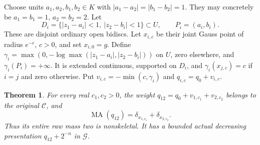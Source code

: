 \documentclass[11pt]{article}
\newtheorem{theorem}{Theorem}
\newcommand{\MA}{\operatorname{MA}}
\newcommand{\C}{\mathcal C}
\newcommand{\G}{\mathcal G}
\begin{document}
Choose units $a_1,a_2,b_1,b_2\in K$ with
$|a_1-a_2|=|b_1-b_2|=1$. They may concretely be $a_1=b_1=1$,
$a_2=b_2=2$. Let
\[
 D_i=\{|z_1-a_i|<1,\ |z_2-b_i|<1\}\subset U,
 \qquad P_i=(a_i,b_i).
\]
These are disjoint ordinary open bidiscs. Let $x_{i,c}$ be their joint
Gauss point of radius $e^{-c}$, $c>0$, and set $x_{i,0}=g$.
Define $\gamma_i=\max(0,-\log\max(|z_1-a_i|,|z_2-b_i|))$ on $U$,
zero elsewhere, and $\gamma_i(P_i)=+\infty$.
It is extended continuous, supported on $D_i$, and
$\gamma_i(x_{j,c})=c$ if $i=j$ and zero otherwise.
Put $v_{i,c}=-\min(c,\gamma_i)$ and $q_{i,c}=q_0+v_{i,c}$.

\begin{theorem}\label{two}
For every real $c_1,c_2>0$, the weight
$q_{12}=q_0+v_{1,c_1}+v_{2,c_2}$ belongs to the original $\C$, and
\[
 \MA(q_{12})=\delta_{x_{1,c_1}}+\delta_{x_{2,c_2}}.
\]
Thus its entire raw mass two is nonskeletal. It has a bounded actual
decreasing presentation $q_{12}+2^{-n}$ in $\G$.
\end{theorem}
\end{document}
